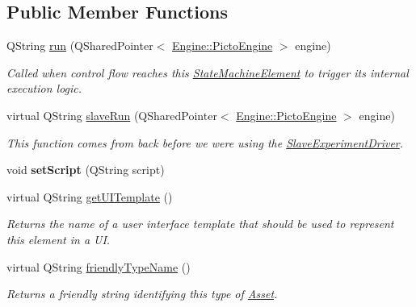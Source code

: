 \subsection*{Public Member Functions}
\begin{DoxyCompactItemize}
\item 
Q\-String \hyperlink{class_picto_1_1_script_element_aedaade30e89d76bf3381e8143bc2e1a4}{run} (Q\-Shared\-Pointer$<$ \hyperlink{class_picto_1_1_engine_1_1_picto_engine}{Engine\-::\-Picto\-Engine} $>$ engine)
\begin{DoxyCompactList}\small\item\em Called when control flow reaches this \hyperlink{class_picto_1_1_state_machine_element}{State\-Machine\-Element} to trigger its internal execution logic. \end{DoxyCompactList}\item 
virtual Q\-String \hyperlink{class_picto_1_1_script_element_a6044e7e03b1690093bd84f40e3b7eb0a}{slave\-Run} (Q\-Shared\-Pointer$<$ \hyperlink{class_picto_1_1_engine_1_1_picto_engine}{Engine\-::\-Picto\-Engine} $>$ engine)
\begin{DoxyCompactList}\small\item\em This function comes from back before we were using the \hyperlink{class_picto_1_1_slave_experiment_driver}{Slave\-Experiment\-Driver}. \end{DoxyCompactList}\item 
\hypertarget{class_picto_1_1_script_element_ac5c0ca0b81a31b52e36305bed256668a}{void {\bfseries set\-Script} (Q\-String script)}\label{class_picto_1_1_script_element_ac5c0ca0b81a31b52e36305bed256668a}

\item 
\hypertarget{class_picto_1_1_script_element_a23659e3350bcf61291946eb624cef261}{virtual Q\-String \hyperlink{class_picto_1_1_script_element_a23659e3350bcf61291946eb624cef261}{get\-U\-I\-Template} ()}\label{class_picto_1_1_script_element_a23659e3350bcf61291946eb624cef261}

\begin{DoxyCompactList}\small\item\em Returns the name of a user interface template that should be used to represent this element in a U\-I. \end{DoxyCompactList}\item 
virtual Q\-String \hyperlink{class_picto_1_1_script_element_a3b5169fa49d2ae3ada252453abb30014}{friendly\-Type\-Name} ()
\begin{DoxyCompactList}\small\item\em Returns a friendly string identifying this type of \hyperlink{class_picto_1_1_asset}{Asset}. \end{DoxyCompactList}\end{DoxyCompactItemize}
